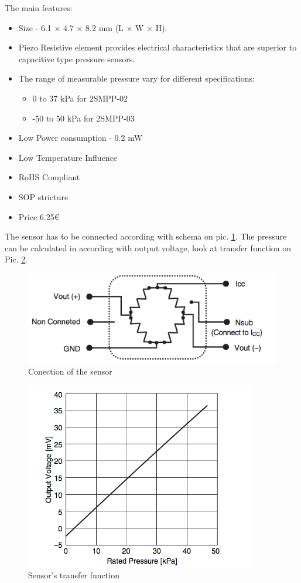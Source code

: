 \documentclass[english]{article}
\begin{document}
The main features:
\begin{itemize}
\item Size - 6.1 × 4.7 × 8.2 mm (L × W × H).
\item Piezo Resistive element provides electrical characteristics that are superior to capacitive type pressure sensors.
\item The range of measurable pressure vary for different specifications: 
\begin{itemize}
\item  0 to 37 kPa for 2SMPP-02
\item -50 to 50 kPa for 2SMPP-03
\end{itemize}
\item Low Power consumption -  0.2 mW
\item Low Temperature Influence
\item RoHS Compliant
\item SOP stricture
\item Price 6.25\euro
\end{itemize}

The sensor has to be connected according with schema on pic. \ref{fig:terminal}. The pressure can be calculated in according with output voltage, look at transfer function on Pic. \ref{fig:grapth}.\cite{ds}

\begin{figure}
\centerline{\includegraphics[scale=0.5]{PressureSensors/terminal}}
\caption{Conection of the sensor\label{fig:terminal}}
\end{figure}
\begin{figure}
\centerline{\includegraphics[scale=0.5]{PressureSensors/grapth}}
\caption{Sensor's transfer function\label{fig:grapth}}
\end{figure}
\end{document}
